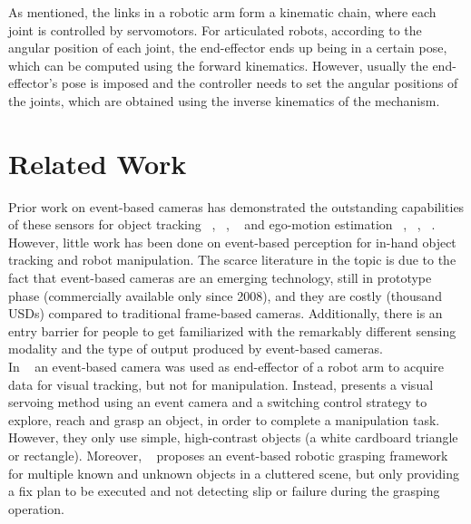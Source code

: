 As mentioned, the links in a robotic arm form a kinematic chain, where each joint is controlled by servomotors. For articulated robots, according to the angular position of each joint, the end-effector ends up being in a certain pose, which can be computed using the forward kinematics. However, usually the end-effector's pose is imposed and the controller needs to set the angular positions of the joints, which are obtained using the inverse kinematics of the mechanism.

\section{Related Work}

Prior work on event-based cameras has demonstrated the outstanding capabilities of these sensors for object tracking ~\cite{OT1}, ~\cite{OT2}, ~\cite{gallego2020} and ego-motion estimation ~\cite{EM1}, ~\cite{EM2}, ~\cite{gallego2020}. However, little work has been done on event-based perception for in-hand object tracking and robot manipulation. The scarce literature in the topic is due to the fact that event-based cameras are an emerging technology, still in prototype phase (commercially available only since 2008), and they are costly (thousand USDs) compared to traditional frame-based cameras. Additionally, there is an entry barrier for people to get familiarized with the remarkably different sensing modality and the type of output produced by event-based cameras.\\

In ~\cite{barranco2018} an event-based camera was used as end-effector of a robot arm to acquire data for visual tracking, but not for manipulation. Instead, \cite{muthusamy2020} presents a visual servoing method using an event camera and a switching control strategy to explore, reach and grasp an object, in order to complete a manipulation task. However, they only use simple, high-contrast objects (a white cardboard triangle or rectangle). Moreover, ~\cite{huang2021} proposes an event-based robotic grasping framework for multiple known and unknown objects in a cluttered scene, but only providing a fix plan to be executed and not detecting slip or failure during the grasping operation.\\

